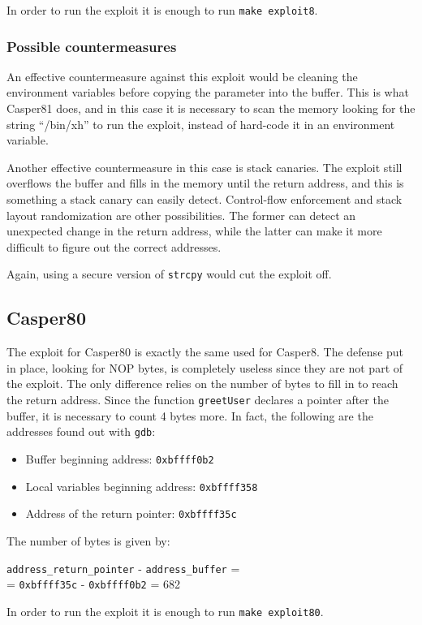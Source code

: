 In order to run the exploit it is enough to run \texttt{make exploit8}.

\subsubsection{Possible countermeasures}
An effective countermeasure against this exploit would be cleaning the environment variables before copying the parameter into the buffer. This is what Casper81 does, and in this case it is necessary to scan the memory looking for the string ``/bin/xh'' to run the exploit, instead of hard-code it in an environment variable.

Another effective countermeasure in this case is stack canaries. The exploit still overflows the buffer and fills in the memory until the return address, and this is something a stack canary can easily detect. Control-flow enforcement and stack layout randomization are other possibilities. The former can detect an unexpected change in the return address, while the latter can make it more difficult to figure out the correct addresses.

Again, using a secure version of \texttt{strcpy} would cut the exploit off.

\subsection{Casper80}
The exploit for Casper80 is exactly the same used for Casper8. The defense put in place, looking for NOP bytes, is completely useless since they are not part of the exploit. The only difference relies on the number of bytes to fill in to reach the return address. Since the function \texttt{greetUser} declares a pointer after the buffer, it is necessary to count 4 bytes more. In fact, the following are the addresses found out with \texttt{gdb}:
\begin{itemize}
	\item Buffer beginning address: \texttt{0xbffff0b2}
	\item Local variables beginning address: \texttt{0xbffff358}
	\item Address of the return pointer: \texttt{0xbffff35c}
\end{itemize}
The number of bytes is given by:
\begin{center}
	\texttt{address\_return\_pointer} - \texttt{address\_buffer} =\\
	= \texttt{0xbffff35c} - \texttt{0xbffff0b2} = 682
\end{center}


In order to run the exploit it is enough to run \texttt{make exploit80}.